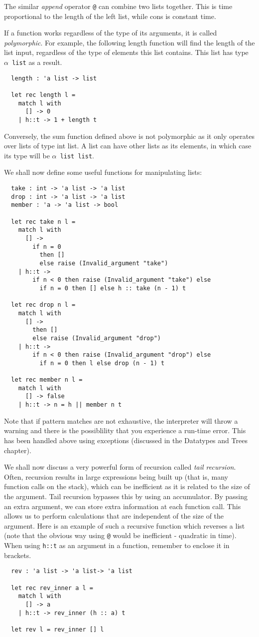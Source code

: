 \documentclass[12pt]{article}
\begin{document}
The similar \textit{append} operator \texttt{@} can combine two lists together. This is time proportional to the length of the left list,
while cons is constant time.

If a function works regardless of the type of its arguments, it is called \textit{polymorphic}. For example, the following length
function will find the length of the list input, regardless of the type of elements this list contains. This list has type \texttt{$\alpha$ list} as
a result.
\begin{lstlisting}
  length : 'a list -> list

  let rec length l =
    match l with
      [] -> 0
    | h::t -> 1 + length t
\end{lstlisting}
Conversely, the sum function defined above is not polymorphic as it only operates over lists of type int list. A list can have
other lists as its elements, in which case its type will be \texttt{$\alpha$ list list}.

We shall now define some useful functions for manipulating lists:
\begin{lstlisting}
  take : int -> 'a list -> 'a list
  drop : int -> 'a list -> 'a list
  member : 'a -> 'a list -> bool

  let rec take n l =
    match l with
      [] ->
        if n = 0
          then []
          else raise (Invalid_argument "take")
    | h::t ->
        if n < 0 then raise (Invalid_argument "take") else
          if n = 0 then [] else h :: take (n - 1) t

  let rec drop n l =
    match l with
      [] ->
        then []
        else raise (Invalid_argument "drop")
    | h::t ->
        if n < 0 then raise (Invalid_argument "drop") else
          if n = 0 then l else drop (n - 1) t

  let rec member n l =
    match l with
      [] -> false
    | h::t -> n = h || member n t
\end{lstlisting}
Note that if pattern matches are not exhaustive, the interpreter will throw a warning
and there is the possiblility that you experience a run-time error. This has been handled
above using exceptions (discussed in the Datatypes and Trees chapter).

We shall now discuss a very powerful form of recursion called \textit{tail recursion}. Often, recursion results in
large expressions being built up (that is, many function calls on the stack), which can be inefficient as it is related to the
size of the argument. Tail recursion
bypasses this by using an accumulator. By passing an extra argument, we can store extra information at each function
call. This allows us to perform calculations that are independent of the size of the argument. Here is an example of
such a recursive function which reverses a list (note that the obvious way using \texttt{@} would be inefficient - quadratic in time).
When using \texttt{h::t} as an argument in a function, remember to enclose it in brackets.
\begin{lstlisting}
  rev : 'a list -> 'a list-> 'a list

  let rec rev_inner a l =
    match l with
      [] -> a
    | h::t -> rev_inner (h :: a) t

  let rev l = rev_inner [] l
\end{lstlisting}
\end{document}
